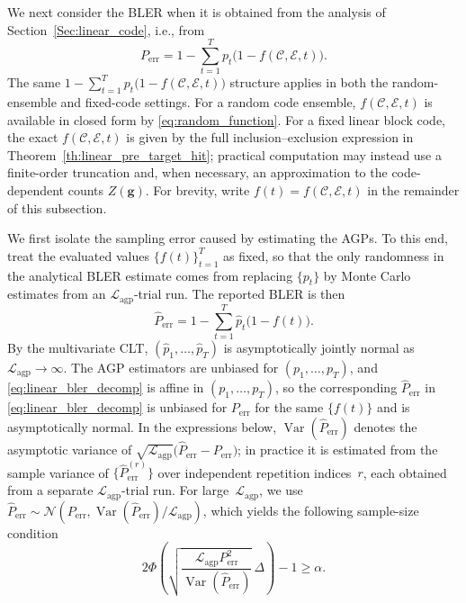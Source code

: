 \documentclass[letterpaper,draftclsnofoot,onecolumn]{IEEEtran}
\begin{document}
We next consider the BLER when it is obtained from the analysis of Section~\ref{Sec:linear_code}, i.e., from
\begin{equation}\label{eq:linear_bler_decomp}
P_{\text{err}} = 1 - \sum_{t=1}^{T} p_t\bigl(1 - f(\mathcal{C}, \mathcal{E}, t)\bigr).
\end{equation}
The same $1 - \sum_{t=1}^{T} p_t\bigl(1 - f(\mathcal{C}, \mathcal{E}, t)\bigr)$ structure applies in both the random-ensemble and fixed-code settings. For a random code ensemble, $f(\mathcal{C}, \mathcal{E}, t)$ is available in closed form by \eqref{eq:random_function}. For a fixed linear block code, the exact $f(\mathcal{C}, \mathcal{E}, t)$ is given by the full inclusion--exclusion expression in Theorem~\ref{th:linear_pre_target_hit}; practical computation may instead use a finite-order truncation and, when necessary, an approximation to the code-dependent counts $Z(\mathbf{g})$. For brevity, write $f(t)=f(\mathcal{C}, \mathcal{E}, t)$ in the remainder of this subsection.

We first isolate the sampling error caused by estimating the AGPs. To this end, treat the evaluated values $\{f(t)\}_{t=1}^{T}$ as fixed, so that the only randomness in the analytical BLER estimate comes from replacing $\{p_t\}$ by Monte Carlo estimates from an $\mathcal{L}_{\text{agp}}$-trial run. The reported BLER is then
\begin{equation}\label{eq:agp_bler_estimator}
\hat{P}_{\text{err}} = 1 - \sum_{t=1}^{T} \hat{p}_t\bigl(1 - f(t)\bigr).
\end{equation}
By the multivariate CLT, $(\hat{p}_1,\ldots,\hat{p}_T)$ is asymptotically jointly normal as $\mathcal{L}_{\text{agp}}\to\infty$. The AGP estimators are unbiased for $(p_1,\ldots,p_T)$, and \eqref{eq:linear_bler_decomp} is affine in $(p_1,\ldots,p_T)$, so the corresponding $\hat{P}_{\text{err}}$ in \eqref{eq:linear_bler_decomp} is unbiased for $P_{\text{err}}$ for the same $\{f(t)\}$ and is asymptotically normal. In the expressions below, $\operatorname{Var}(\hat{P}_{\text{err}})$ denotes the asymptotic variance of $\sqrt{\mathcal{L}_{\text{agp}}}\bigl(\hat{P}_{\text{err}}-P_{\text{err}}\bigr)$; in practice it is estimated from the sample variance of $\{\hat{P}_{\text{err}}^{(r)}\}$ over independent repetition indices~$r$, each obtained from a separate $\mathcal{L}_{\text{agp}}$-trial run. For large~$\mathcal{L}_{\text{agp}}$, we use $\hat{P}_{\text{err}} \sim \mathcal{N}\!\left(P_{\text{err}}, \operatorname{Var}(\hat{P}_{\text{err}})/\mathcal{L}_{\text{agp}}\right)$, which yields the following sample-size condition
\begin{equation}\label{eq:agp_clt_condition}
2\Phi\!\left(\sqrt{\frac{\mathcal{L}_{\text{agp}} P_{\text{err}}^2}{\operatorname{Var}(\hat{P}_{\text{err}})}} \, \Delta \right) - 1 \geq \alpha.
\end{equation}
\end{document}
